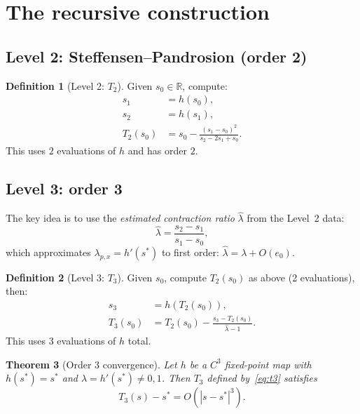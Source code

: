 \documentclass[10pt,a4paper,oneside]{book}
\newtheorem{theorem}{Theorem}[chapter]
\theoremstyle{definition}
\newtheorem{definition}[theorem]{Definition}
\theoremstyle{remark}
\newcommand{\RR}{\mathbb{R}}
\begin{document}
\section{The recursive construction}
\label{sec:construction}

\subsection{Level 2: Steffensen--Pandrosion (order 2)}

\begin{definition}[Level 2: $T_2$]
Given $s_0 \in \RR$, compute:
\begin{align}
  s_1 &= h(s_0), \label{eq:t2_s1} \\
  s_2 &= h(s_1), \label{eq:t2_s2} \\
  T_2(s_0) &= s_0 - \frac{(s_1 - s_0)^2}{s_2 - 2s_1 + s_0}. \label{eq:t2}
\end{align}
This uses $2$ evaluations of $h$ and has order $2$.
\end{definition}

\subsection{Level 3: order 3}

The key idea is to use the \emph{estimated contraction ratio} $\hat{\lambda}$ from the Level~2 data:
\begin{equation}
  \label{eq:lambda_hat}
  \hat{\lambda} = \frac{s_2 - s_1}{s_1 - s_0},
\end{equation}
which approximates $\lambda_{p,x} = h'(s^*)$ to first order: $\hat{\lambda} = \lambda + O(e_0)$.

\begin{definition}[Level 3: $T_3$]
\label{def:T3}
Given $s_0$, compute $T_2(s_0)$ as above (2 evaluations), then:
\begin{align}
  s_3 &= h(T_2(s_0)), \label{eq:t3_s3} \\
  T_3(s_0) &= T_2(s_0) - \frac{s_3 - T_2(s_0)}{\hat{\lambda} - 1}. \label{eq:t3}
\end{align}
This uses $3$ evaluations of $h$ total.
\end{definition}

\begin{theorem}[Order 3 convergence]
\label{thm:order3}
Let $h$ be a $C^3$ fixed-point map with $h(s^*) = s^*$ and $\lambda = h'(s^*) \neq 0, 1$.  Then $T_3$ defined by~\eqref{eq:t3} satisfies
\begin{equation}
  \label{eq:order3}
  T_3(s) - s^* = O(|s - s^*|^3).
\end{equation}
\end{theorem}
\end{document}
